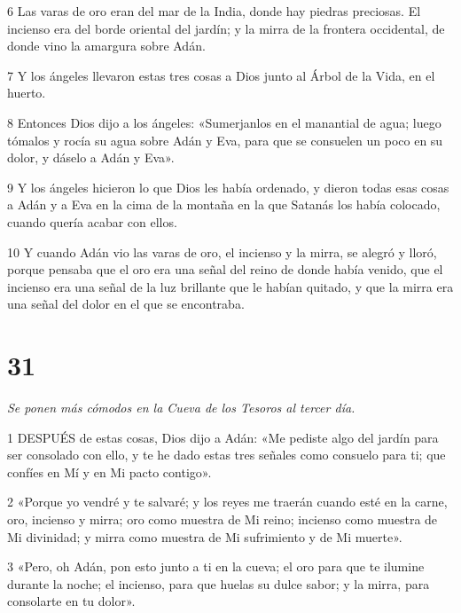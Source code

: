 \par 6 Las varas de oro eran del mar de la India, donde hay piedras preciosas. El incienso era del borde oriental del jardín; y la mirra de la frontera occidental, de donde vino la amargura sobre Adán.

\par 7 Y los ángeles llevaron estas tres cosas a Dios junto al Árbol de la Vida, en el huerto.

\par 8 Entonces Dios dijo a los ángeles: «Sumerjanlos en el manantial de agua; luego tómalos y rocía su agua sobre Adán y Eva, para que se consuelen un poco en su dolor, y dáselo a Adán y Eva».

\par 9 Y los ángeles hicieron lo que Dios les había ordenado, y dieron todas esas cosas a Adán y a Eva en la cima de la montaña en la que Satanás los había colocado, cuando quería acabar con ellos.

\par 10 Y cuando Adán vio las varas de oro, el incienso y la mirra, se alegró y lloró, porque pensaba que el oro era una señal del reino de donde había venido, que el incienso era una señal de la luz brillante que le habían quitado, y que la mirra era una señal del dolor en el que se encontraba.

\chapter{31}

\par \textit{Se ponen más cómodos en la Cueva de los Tesoros al tercer día.}

\par 1 DESPUÉS de estas cosas, Dios dijo a Adán: «Me pediste algo del jardín para ser consolado con ello, y te he dado estas tres señales como consuelo para ti; que confíes en Mí y en Mi pacto contigo».

\par 2 «Porque yo vendré y te salvaré; y los reyes me traerán cuando esté en la carne, oro, incienso y mirra; oro como muestra de Mi reino; incienso como muestra de Mi divinidad; y mirra como muestra de Mi sufrimiento y de Mi muerte».

\par 3 «Pero, oh Adán, pon esto junto a ti en la cueva; el oro para que te ilumine durante la noche; el incienso, para que huelas su dulce sabor; y la mirra, para consolarte en tu dolor».

